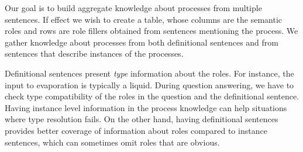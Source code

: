 Our goal is to build aggregate knowledge about processes from multiple sentences. 
If effect we wish to create a table, whose columns are the semantic roles and rows are role fillers obtained from sentences mentioning the process.
We gather knowledge about processes from both definitional sentences and from sentences that describe instances of the processes. 

Definitional sentences present {\em type} information about the roles. 
For instance, the input to evaporation is typically a liquid. 
During question answering, we have to check type compatibility of the roles in the question and the definitional sentence. 
Having instance level information in the process knowledge can help situations where type resolution fails. 
On the other hand, having definitional sentences provides better coverage of information about roles compared to instance sentences,
which can sometimes omit roles that are obvious. 








